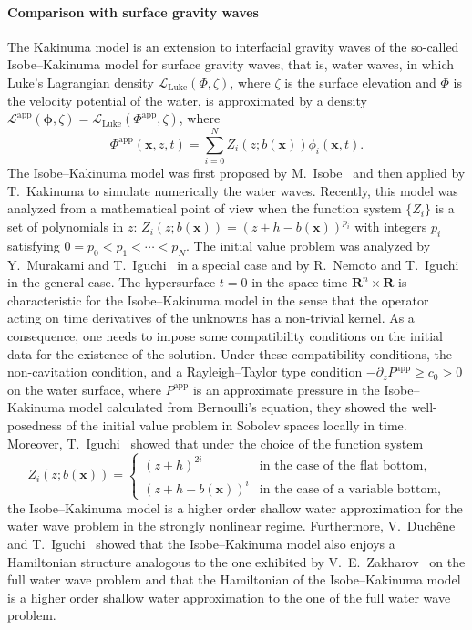 \documentclass[11pt,leqno]{article}
\numberwithin{equation}{section}
\numberwithin{figure}{section}
\begin{document}
\paragraph{Comparison with surface gravity waves}
%
The Kakinuma model is an extension to interfacial gravity waves of the so-called 
Isobe--Kakinuma model for surface gravity waves, that is, water waves, 
in which Luke's Lagrangian density $\mathscr{L}_\mathrm{Luke}(\Phi,\zeta)$, 
where $\zeta$ is the surface elevation and $\Phi$ is the velocity potential of the water, 
is approximated by a density $\mathscr{L}^\mathrm{app}(\bm{\phi},\zeta)=\mathscr{L}_\mathrm{Luke}(\Phi^\mathrm{app},\zeta)$, where 
%
\begin{equation}\label{intro:appww}
	\Phi^\mathrm{app}(\bm{x},z,t) = \sum_{i=0}^N Z_i(z;b(\bm{x}))\phi_{i}(\bm{x},t). 
\end{equation}
%
The Isobe--Kakinuma model was first proposed by M.~Isobe~\cite{Isobe1994,Isobe1994-2} 
and then applied by T.~Kakinuma  to simulate numerically the water waves. 
Recently, this model was analyzed from a mathematical point of view when 
the function system $\{Z_i\}$ is a set of polynomials in $z$:  
$Z_i(z;b(\bm{x}))=(z+h-b(\bm{x}))^{p_i}$ with integers $p_i$ satisfying $0=p_0<p_1<\cdots<p_N$. 
The initial value problem was analyzed by Y.~Murakami and T.~Iguchi~\cite{MurakamiIguchi2015} in a special case 
and by R.~Nemoto and T.~Iguchi~\cite{NemotoIguchi2018} in the general case. 
The hypersurface $t=0$ in the space-time $\mathbf{R}^n\times\mathbf{R}$ is characteristic for 
the Isobe--Kakinuma model in the sense that the operator acting on time derivatives of the unknowns has a non-trivial kernel. 
As a consequence, one needs to impose some compatibility conditions on the initial data 
for the existence of the solution. 
Under these compatibility conditions, the non-cavitation condition, and a Rayleigh--Taylor type condition 
$-\partial_z P^\mathrm{app} \geq c_0>0$ on the water surface, where $P^\mathrm{app}$ 
is an approximate pressure in the Isobe--Kakinuma model calculated from Bernoulli's equation, 
they showed the well-posedness of the initial value problem in Sobolev spaces locally in time. 
Moreover, T.~Iguchi~\cite{Iguchi2018-1,Iguchi2018-2} showed that under the choice of the function system 
%
\begin{equation}\label{intro:base}
	Z_i(z;b(\bm{x})) = 
	\begin{cases}
		(z+h)^{2i} & \mbox{in the case of the flat bottom}, \\
		(z+h-b(\bm{x}))^i & \mbox{in the case of a variable bottom},
	\end{cases}
\end{equation}
%
the Isobe--Kakinuma model is a higher order shallow water approximation for the water wave problem 
in the strongly nonlinear regime. 
Furthermore, V.~Duch\^ene and T.~Iguchi~\cite{DucheneIguchi2019-1} showed that the Isobe--Kakinuma model 
also enjoys a Hamiltonian structure analogous to the one exhibited by V.~E.~Zakharov~\cite{Zakharov1968} 
on the full water wave problem and that the Hamiltonian of the Isobe--Kakinuma model is a higher order 
shallow water approximation to the one of the full water wave problem. 
\end{document}
